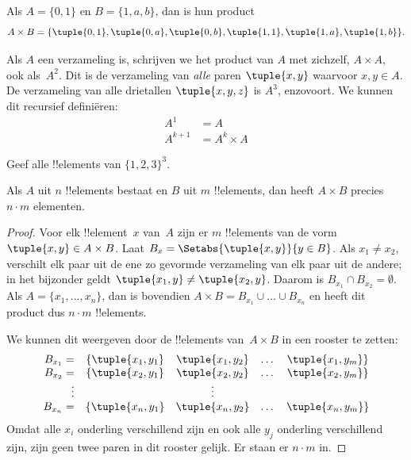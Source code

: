\documentclass[../../../include/open-logic-section]{subfiles}
\begin{document}
\begin{ex}
Als $A = \{0, 1\}$ en $B = \{1, a, b\}$, dan is hun product
\[
A \times B = \{ \tuple{0, 1}, \tuple{0, a}, \tuple{0, b},
    \tuple{1, 1}, \tuple{1, a}, \tuple{1, b} \}.
\]
\end{ex}

\begin{ex}
Als $A$ een verzameling is, schrijven we het product van $A$ met
zichzelf, $A \times A$, ook als~$A^2$. Dit is de verzameling van
\emph{alle} paren $\tuple{x, y}$ waarvoor $x, y \in A$. De
verzameling van alle drietallen $\tuple{x, y, z}$ is $A^3$,
enzovoort. We kunnen dit recursief definiëren:
\begin{align*}
  A^1 & = A\\
  A^{k+1} & = A^k \times A
\end{align*}
\end{ex}

\begin{prob}
Geef alle !!{element}s van $\{1, 2, 3\}^3$.
\end{prob}

\begin{prop}
Als $A$ uit $n$ !!{element}s bestaat en $B$ uit $m$ !!{element}s, dan
heeft $A \times B$ precies $n\cdot m$ elementen.
\end{prop}

\begin{proof}
Voor elk !!{element}~$x$ van~$A$ zijn er $m$ !!{element}s van de vorm
$\tuple{x, y} \in A \times B$. Laat $B_x = \Setabs{\tuple{x, y}}{y
  \in B}$. Als $x_1 \neq x_2$, verschilt elk paar uit de ene zo
gevormde verzameling van elk paar uit de andere; in het bijzonder geldt $\tuple{x_1, y} \neq
\tuple{x_2, y}$. Daarom is $B_{x_1} \cap B_{x_2} = \emptyset$. Als
$A = \{x_1, \dots, x_n\}$, dan is bovendien $A \times B = B_{x_1}
\cup \dots \cup B_{x_n}$ en heeft dit product dus $n\cdot m$
!!{element}s.

We kunnen dit weergeven door de !!{element}s van~$A \times B$ in een
rooster te zetten:
\[
\begin{array}{rcccc}
  B_{x_1} = & \{\tuple{x_1, y_1} & \tuple{x_1, y_2} & \dots & \tuple{x_1, y_m}\}\\
  B_{x_2} = & \{\tuple{x_2, y_1} & \tuple{x_2, y_2} & \dots & \tuple{x_2, y_m}\}\\
  \vdots & & \vdots\\
  B_{x_n} = & \{\tuple{x_n, y_1} & \tuple{x_n, y_2} & \dots & \tuple{x_n, y_m}\}
\end{array}
\]
Omdat alle $x_i$ onderling verschillend zijn en ook alle $y_j$
onderling verschillend zijn, zijn geen twee paren in dit rooster
gelijk. Er staan er $n\cdot m$ in.
\end{proof}
\end{document}
